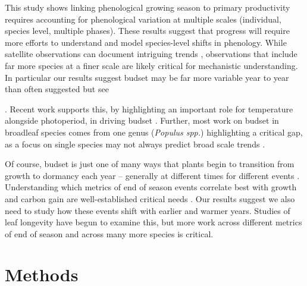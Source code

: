 \documentclass{article}[12pt]
\begin{document}
 This study shows linking phenological growing season to primary productivity requires accounting for phenological variation at multiple scales (individual, species level, multiple phases). These results suggest that progress will require more efforts to understand and model species-level shifts in phenology. While satellite observations can document intriguing trends \citep[e.g.,][]{Zohner2023}, observations that include far more species at a finer scale are likely critical for mechanistic understanding. In particular our results suggest budset may be far more variable year to year than often suggested \citep{Michelson2018} but see{\citep{mckown2014, Vander2016}. Recent work supports this, by highlighting an important role for temperature alongside photoperiod, in driving budset \citep{Olsen2014,Rohde2011}. %
 Further, most work on budset in broadleaf species comes from one genus (\emph{Populus spp.}) highlighting a critical gap, as a focus on single species may not always predict broad scale trends \citep{Morales-Castilla2024}. 
 
Of course, budset is just one of many ways that plants begin to transition from growth to dormancy each year -- generally at different times for different events \citep{Michelson2018}. Understanding which metrics of end of season events correlate best with growth and carbon gain are well-established critical needs \citep{GALLINAT2015}. Our results suggest we also need to study how these events shift with earlier and warmer years. Studies of leaf longevity have begun to examine this, but more work across different metrics of end of season and across many more species is critical.
 
 
\section{Methods} %
}
\end{document}

